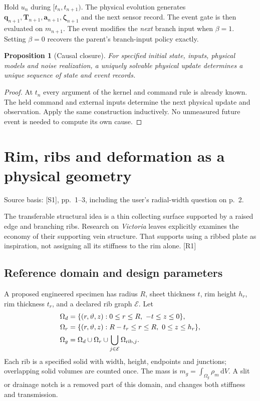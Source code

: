 \documentclass[10pt,a4paper]{article}
\numberwithin{equation}{section}
\newtheorem{proposition}{Proposition}[section]
\newcommand{\src}[1]{\textcolor{muted}{\footnotesize Source basis: #1.}}
\newcommand{\newpart}{\clearpage}
\newcommand{\dd}{\,\mathrm{d}}
\begin{document}
Hold $u_n$ during $[t_n,t_{n+1})$. The physical evolution generates $\bm q_{n+1},\bm T_{n+1},\bm a_{n+1},\bm\zeta_{n+1}$ and the next sensor record. The event gate is then evaluated on $m_{n+1}$. The event modifies the \emph{next} branch input when $\beta=1$. Setting $\beta=0$ recovers the parent's branch-input policy exactly.

\begin{proposition}[Causal closure]
For specified initial state, inputs, physical models and noise realization, a uniquely solvable physical update determines a unique sequence of state and event records.
\end{proposition}
\begin{proof}
At $t_n$ every argument of the kernel and command rule is already known. The held command and external inputs determine the next physical update and observation. Apply the same construction inductively. No unmeasured future event is needed to compute its own cause.
\end{proof}

\newpart
\section{Rim, ribs and deformation as a physical geometry}
\label{sec:mechanics}
\src{[S1], pp.~1--3, including the user's radial-width question on p.~2}

The transferable structural idea is a thin collecting surface supported by a raised edge and branching ribs. Research on \emph{Victoria} leaves explicitly examines the economy of their supporting vein structure. That supports using a ribbed plate as inspiration, not assigning all its stiffness to the rim alone. [R1]

\subsection*{Reference domain and design parameters}
A proposed engineered specimen has radius $R$, sheet thickness $t$, rim height $h_r$, rim thickness $t_r$, and a declared rib graph $\mathcal E$. Let
\begin{align}
\Omega_d&=\{(r,\vartheta,z):0\le r\le R,\ -t\le z\le0\},\\
\Omega_r&=\{(r,\vartheta,z):R-t_r\le r\le R,\ 0\le z\le h_r\},\\
\Omega_g&=\Omega_d\cup\Omega_r\cup\bigcup_{j\in\mathcal E}\Omega_{{\rm rib},j}.
\end{align}
Each rib is a specified solid with width, height, endpoints and junctions; overlapping solid volumes are counted once. The mass is $m_g=\int_{\Omega_g}\rho_m\dd V$. A slit or drainage notch is a removed part of this domain, and changes both stiffness and transmission.
\end{document}
